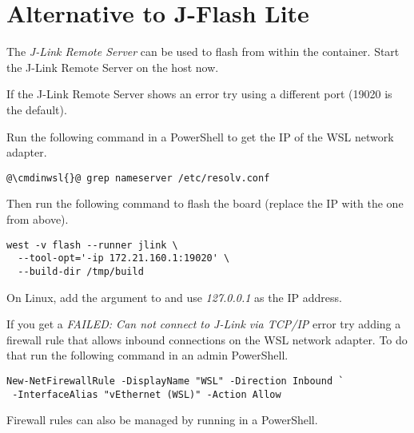 \newpage

\appendix

\section{Alternative to J-Flash Lite}\label{jlinkremote}

The \emph{J-Link Remote Server} can be used to flash from within the container.
Start the J-Link Remote Server on the host now.

\begin{infobox}
  If the J-Link Remote Server shows an error try using a different port (19020
  is the default).
\end{infobox}

Run the following command in a PowerShell to get the IP of the WSL network
adapter.

\begin{lstlisting}
@\cmdinwsl{}@ grep nameserver /etc/resolv.conf
\end{lstlisting}

Then run the following command to flash the board (replace the IP with the one
from above).

\begin{lstlisting}
west -v flash --runner jlink \
  --tool-opt='-ip 172.21.160.1:19020' \
  --build-dir /tmp/build
\end{lstlisting}

\begin{infobox}
  On Linux, add the  argument to 
  and use \emph{127.0.0.1} as the IP address.
\end{infobox}

\begin{infobox}
  If you get a \emph{FAILED: Can not connect to J-Link via TCP/IP} error try
  adding a firewall rule that allows inbound connections on the WSL network
  adapter. To do that run the following command in an admin PowerShell.

  \begin{lstlisting}
New-NetFirewallRule -DisplayName "WSL" -Direction Inbound `
 -InterfaceAlias "vEthernet (WSL)" -Action Allow
\end{lstlisting}

  Firewall rules can also be managed by running  in a PowerShell.
\end{infobox}

\newpage

\fancyfoot{}

